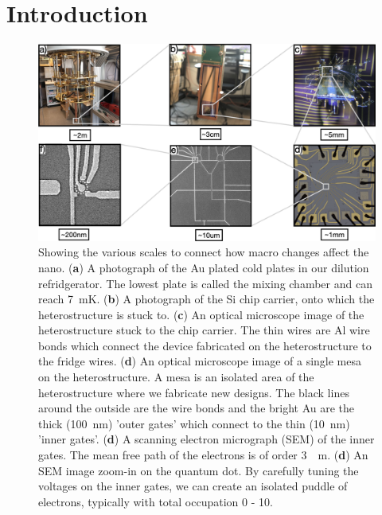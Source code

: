 \chapter{Introduction}\label{cha:intro}


\begin{figure}[!htb]
  \begin{center}
    \includegraphics[width=1.0\textwidth]{figures/ch1/crop_PosterFiguresMaster.001.png}
    \caption[Dilution fridge to quantum dot scale breakdown]{\label{fig:ch1/scale_breakdown} 
    Showing the various scales to connect how macro changes affect the nano. (\textbf{a}) A photograph of the Au plated cold plates in our dilution refridgerator. The lowest plate is called the mixing chamber and can reach \qty{7}{mK}. (\textbf{b}) A photograph of the Si chip carrier, onto which the heterostructure is stuck to. (\textbf{c}) An optical microscope image of the heterostructure stuck to the chip carrier. The thin wires are Al wire bonds which connect the device fabricated on the heterostructure to the fridge wires. (\textbf{d}) An optical microscope image of a single mesa on the heterostructure. A mesa is an isolated area of the heterostructure where we fabricate new designs. The black lines around the outside are the wire bonds and the bright Au are the thick (\qty{100}{nm}) 'outer gates' which connect to the thin (\qty{10}{nm}) 'inner gates'. (\textbf{d}) A scanning electron micrograph (SEM) of the inner gates. The mean free path of the electrons is of order \qty{3}{\mu m}.  (\textbf{d}) An SEM image zoom-in on the quantum dot. By carefully tuning the voltages on the inner gates, we can create an isolated puddle of electrons, typically with total occupation 0 - 10.  
      }
  \end{center}
\end{figure}